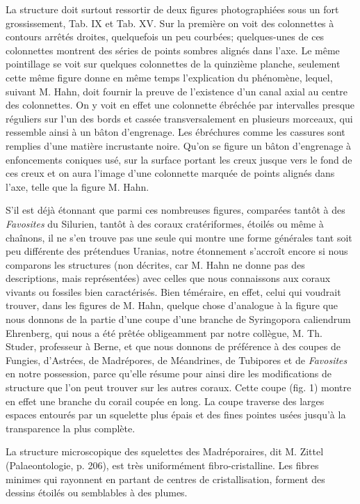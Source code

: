 \documentclass[a4paper, 12pt, oneside, french]{book}
\begin{document}
La structure doit surtout ressortir de deux figures photographiées sous un fort grossissement, Tab. IX et Tab. XV. Sur la première on voit des colonnettes à contours arrêtés droites, quelquefois un peu courbées; quelques-unes de ces colonnettes montrent des séries de points sombres alignés dans l'axe. Le même pointillage se voit sur quelques colonnettes de la quinzième planche, seulement cette même figure donne en même temps l'explication du phénomène, lequel, suivant M. Hahn, doit fournir la preuve de l'existence d'un canal axial au centre des colonnettes. On y voit en effet une colonnette ébréchée par intervalles presque réguliers sur l'un des bords et cassée transversalement en plusieurs morceaux, qui ressemble ainsi à un bâton d'engrenage. Les ébréchures comme les cassures sont remplies d'une matière incrustante noire. Qu'on se figure un bâton d'engrenage à enfoncements coniques usé, sur la surface portant les creux jusque vers le fond de ces creux et on aura l'image d'une colonnette marquée de points alignés dans l'axe, telle que la figure M. Hahn.

S'il est déjà étonnant que parmi ces nombreuses figures, comparées tantôt à des \emph{Favosites} du Silurien, tantôt à des coraux cratériformes, étoilés ou même à chaînons, il ne s'en trouve pas une seule qui montre une forme générales tant soit peu différente des prétendues Uranias, notre étonnement s'accroît encore si nous comparons les structures (non décrites, car M. Hahn ne donne pas des descriptions, mais représentées) avec celles que nous connaissons aux coraux vivants ou fossiles bien caractérisés. Bien téméraire, en effet, celui qui voudrait trouver, dans les figures de M. Hahn, quelque chose d'analogue à la figure que nous donnons de la partie d'une coupe d'une branche de Syringopora caliendrum Ehrenberg, qui nous a été prêtée obligeamment par notre collègue, M. Th. Studer, professeur à Berne, et que nous donnons de préférence à des coupes de Fungies, d'Astrées, de Madrépores, de Méandrines, de Tubipores et de \emph{Favosites} en notre possession, parce qu'elle résume pour ainsi dire les modifications de structure que l'on peut trouver sur les autres coraux. Cette coupe (fig. 1) montre en effet une branche du corail coupée en long. La coupe traverse des larges espaces entourés par un squelette plus épais et des fines pointes usées jusqu'à la transparence la plus complète.

\og La structure microscopique des squelettes des Madréporaires, dit M. Zittel (Palaeontologie, p. 206), est très uniformément fibro-cristalline. Les fibres minimes qui rayonnent en partant de centres de cristallisation, forment des dessins étoilés ou semblables à des plumes. \fg
\end{document}

